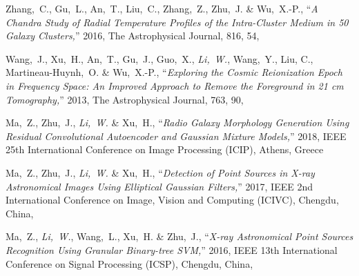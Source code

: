 \begin{publications}{99}
    Zhang,~C., Gu,~L., An,~T., Liu,~C., Zhang,~Z., Zhu,~J. \& Wu,~X.-P.,
    \enquote{\it A Chandra Study of Radial Temperature Profiles of the
      Intra-Cluster Medium in 50 Galaxy Clusters,}
    2016, The Astrophysical Journal, 816, 54,
  \item Wang,~J., Xu,~H., An,~T., Gu,~J., Guo,~X., \emph{Li,~W.},
    Wang,~Y., Liu, C., Martineau-Huynh,~O. \& Wu,~X.-P.,
    \enquote{\it Exploring the Cosmic Reionization Epoch in Frequency
      Space: An Improved Approach to Remove the Foreground in 21 cm
      Tomography,}
    2013, The Astrophysical Journal, 763, 90,
  \item Ma,~Z., Zhu,~J., \emph{Li,~W.} \& Xu,~H.,
    \enquote{\it Radio Galaxy Morphology Generation Using Residual
      Convolutional Autoencoder and Gaussian Mixture Models,}
    2018, IEEE 25th International Conference on Image Processing (ICIP),
    Athens, Greece
  \item Ma,~Z., Zhu,~J., \emph{Li,~W.} \& Xu,~H.,
    \enquote{\it Detection of Point Sources in X-ray Astronomical Images
      Using Elliptical Gaussian Filters,}
    2017, IEEE 2nd International Conference on Image, Vision and Computing (ICIVC),
    Chengdu, China,
  \item Ma,~Z., \emph{Li,~W.}, Wang,~L., Xu,~H. \& Zhu,~J.,
    \enquote{\it X-ray Astronomical Point Sources Recognition Using
      Granular Binary-tree SVM,}
    2016, IEEE 13th International Conference on Signal Processing (ICSP),
    Chengdu, China,
\end{publications}

